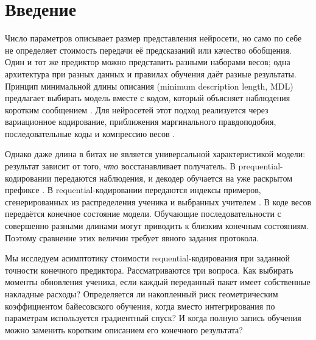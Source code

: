 \section{Введение}

Число параметров описывает размер представления нейросети, но само по себе не
определяет стоимость передачи её предсказаний или качество обобщения. Один и тот
же предиктор можно представить разными наборами весов; одна архитектура при
разных данных и правилах обучения даёт разные результаты. Принцип минимальной
длины описания (minimum description length, MDL) предлагает выбирать модель
вместе с кодом, который объясняет наблюдения коротким сообщением
\citep{grunwald2004}. Для нейросетей этот подход реализуется через вариационное
кодирование, приближения маргинального правдоподобия, последовательные коды и
компрессию весов \citep{graves2011,ritter2018,blier2018,arora2018}.

Однако даже длина в битах не является универсальной характеристикой модели:
результат зависит от того, \emph{что} восстанавливает получатель. В
prequential-кодировании передаются наблюдения, и декодер обучается на уже
раскрытом префиксе \citep{blier2018,bornschein2022}. В requential-кодировании
передаются индексы примеров, сгенерированных из распределения ученика и
выбранных учителем \citep{finzi2026,qiu2026}. В коде весов передаётся конечное
состояние модели. Обучающие последовательности с совершенно разными длинами
могут приводить к близким конечным состояниям. Поэтому сравнение этих величин
требует явного задания протокола.

Мы исследуем асимптотику стоимости requential-кодирования при заданной
точности конечного предиктора. Рассматриваются три вопроса. Как выбирать моменты
обновления ученика, если каждый переданный пакет имеет собственные накладные
расходы? Определяется ли накопленный риск геометрическим коэффициентом
байесовского обучения, когда вместо интегрирования по параметрам используется
градиентный спуск? И когда полную запись обучения можно заменить коротким
описанием его конечного результата?

